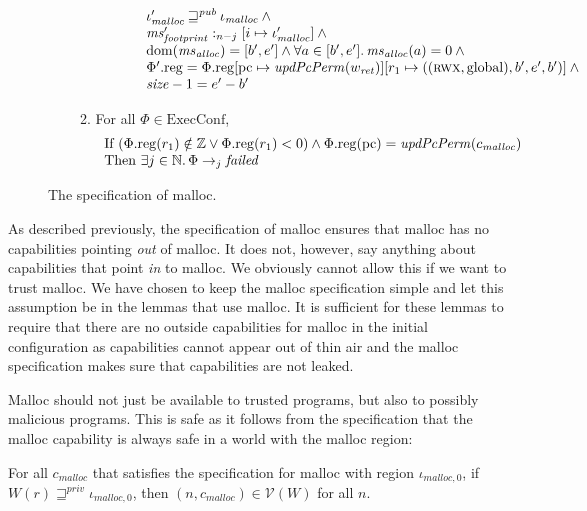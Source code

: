 \documentclass[format=acmsmall, review=true, screen=true]{acmart}
\newcommand{\update}[2]{[#1 \mapsto #2]}
\DeclareMathOperator{\dom}{dom}
\newcommand{\var}[1]{\mathit{#1}}
\newcommand{\hs}{\var{ms}}
\newcommand{\ms}{\hs}
\newcommand{\pcreg}{\mathrm{pc}}
\newcommand{\heap}{\var{mem}}
\newcommand{\size}{\var{size}}
\newcommand{\plainproj}[1]{\mathrm{#1}}
\newcommand{\memreg}[1][\Phi]{#1.\plainproj{reg}}
\newcommand{\failed}{\mathit{failed}}
\newcommand{\plainfun}[2]{
  \ifthenelse{\equal{#2}{}}
  {\mathit{#1}}
  {\mathit{#1}(#2)}
}
\newcommand{\updatePcPerm}[1]{\plainfun{updPcPerm}{#1}}
\newcommand{\futurewk}{\mathbin{\sqsupseteq}^{\var{pub}}}
\newcommand{\futurestr}{\mathbin{\sqsupseteq}^{\var{priv}}}
\newcommand{\heapSat}[3][\heap]{#1 :_{#2} #3}
\newcommand{\codelabel}[1]{\mathit{#1}}
\newcommand{\malloc}{\codelabel{malloc}}
\newcommand{\asmType}{\plaindom{AsmType}}
\newcommand{\plaindom}[1]{\mathrm{#1}}
\newcommand{\ExecConfs}{\plaindom{ExecConf}}
\newcommand{\nats}{\mathbb{N}}
\newcommand{\ints}{\mathbb{Z}}
\newcommand{\intr}[2]{\mathcal{#1}}
\newcommand{\valueintr}[1]{\intr{V}{#1}}
\newcommand{\stdvr}{\valueintr{\asmType}}
\newcommand{\npair}[2][n]{\left(#1,#2 \right)}
\newcommand{\plainperm}[1]{\textsc{#1}}
\newcommand{\rwx}{\plainperm{rwx}}
\newcommand{\plainlocality}[1]{\mathrm{#1}}
\newcommand{\glob}{\plainlocality{global}}
\newcommand{\step}[1][]{\rightarrow_{#1}}
\newenvironment{toplas}%
    {\color{OliveGreen}}{}
\begin{document}
\begin{toplas}
\begin{figure}[htb]
\begin{definition}
\begin{enumerate}
\begin{enumerate}
\[\begin{array}{l}
            \qquad \quad \iota_{\malloc}' \futurewk \iota_\malloc \land{} \\
            \qquad \quad \heapSat[\ms_{\var{footprint}}']{n-j}{[i \mapsto \iota_\malloc']} \land{} \\
            \qquad \quad \dom(\hs_{\var{alloc}}) = [b',e'] \land \forall a \in [b',e']\ldotp \hs_{\var{alloc}}(a) = 0  \land{} \\
            \qquad \quad \memreg[\Phi'] = \memreg[\Phi]\update{\pcreg}{\updatePcPerm{w_{\var{ret}}}}\update{r_1}{((\rwx,\glob),b',e',b')} \land{} \\
            \qquad \quad \size - 1 = e'-b'
          \end{array}
        \]
      \item \label{item:malloc-spec:fail} For all $\Phi \in \ExecConfs$,
        \[
          \begin{array}{l}
            \text{If } (\memreg(r_1) \notin \ints \vee \memreg(r_1) < 0) \land
            \memreg(\pcreg) = \updatePcPerm{c_\malloc} \\
            \text{Then } \exists j \in \nats \ldotp \Phi \step[j] \failed
          \end{array}
        \]
      \end{enumerate}
    \end{enumerate}
  \end{definition}
  
  \caption{The specification of malloc.}
  \label{fig:malloc-spec}
\end{figure}
As described previously, the specification of malloc ensures that malloc has no
capabilities pointing \emph{out} of malloc. It does not, however, say anything about
capabilities that point \emph{in} to malloc. We obviously cannot
allow this if we want to trust malloc. We have chosen to keep the malloc
specification simple and let this assumption be in the lemmas that use malloc.
It is sufficient for these lemmas to require that there are no outside
capabilities for malloc in the initial configuration as capabilities cannot
appear out of thin air and the malloc specification makes sure that capabilities
are not leaked.

Malloc should not just be available to trusted programs, but also to possibly
malicious programs. This is safe as it follows from the specification that the malloc
capability is always safe in a world with the malloc region:
\begin{lemma}
  \label{lem:malloc-in-vr}
  For all $c_\malloc$ that satisfies the specification for malloc with region $\iota_{\malloc,0}$,  if $W(r) \futurestr \iota_{\malloc,0}$, then
  $\npair{c_\malloc} \in \stdvr(W)$ for all $n$.
\end{lemma}


\end{toplas}
\end{document}
